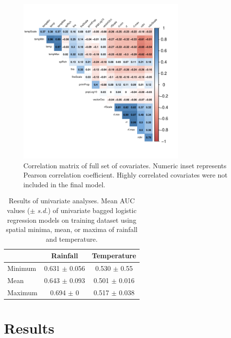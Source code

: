 \documentclass{article}
\begin{document}
\begin{figure}
\centering
\includegraphics[width=0.75\textwidth]{correlationMatrix}
\caption{Correlation matrix of full set of covariates. Numeric inset represents Pearson correlation coefficient. Highly correlated covariates were not included in the final model.}
\label{fig:corrmat}
\end{figure}

\begin{table} [h]
\normalsize
\centering
\caption{Results of univariate analyses. Mean AUC values ($\pm$ \textit{s.d.}) of univariate bagged logistic regression models on training dataset using spatial minima, mean, or maxima of rainfall and temperature.}
\label{table:univarateAnalyses}
\begin{tabular}{lcc}
          & Rainfall                     & Temperature                   \\ \hline
Minimum   & 0.631 $\pm$ 0.056              & 0.530 $\pm$ 0.55                          \\
Mean      & 0.643 $\pm$ 0.093              & 0.501 $\pm$ 0.016                         \\
Maximum   & 0.694 $\pm$ 0                  & 0.517 $\pm$ 0.038
\end{tabular}
\begin{flushleft}
\smallskip

\end{flushleft}
\end{table}

\newpage
\section{Results}
\end{document}
